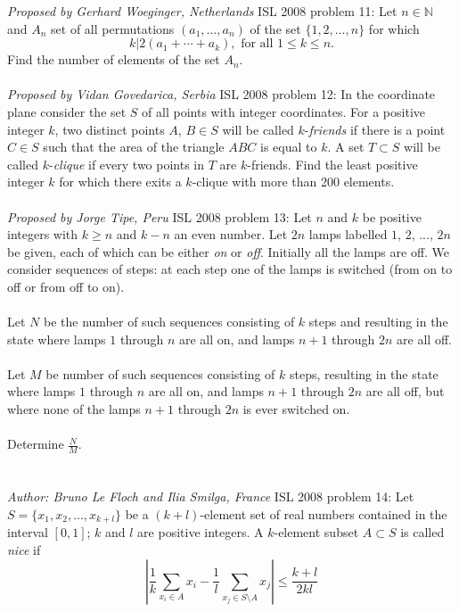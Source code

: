 \textit{Proposed by Gerhard Woeginger, Netherlands} 
ISL 2008 problem 11:  Let $n \in \mathbb N$ and $A_n$ set of all permutations $(a_1, \ldots, a_n)$ of the set $\{1, 2, \ldots , n\}$ for which
\[ k|2(a_1 + \cdots+ a_k), \text{ for all } 1 \leq k \leq n. \]
Find the number of elements of the set $A_n$. \\\\
\textit{Proposed by Vidan Govedarica, Serbia} 
ISL 2008 problem 12:  In the coordinate plane consider the set $ S$ of all points with integer coordinates. For a positive integer $ k$, two distinct points $A$, $ B\in S$ will be called $ k$-\textit{friends} if there is a point $ C\in S$ such that the area of the triangle $ ABC$ is equal to $ k$. A set $ T\subset S$ will be called $ k$-\textit{clique} if every two points in $ T$ are $ k$-friends. Find the least positive integer $ k$ for which there exits a $ k$-clique with more than 200 elements. \\\\
\textit{Proposed by Jorge Tipe, Peru} 
ISL 2008 problem 13:  Let $ n$ and $ k$ be positive integers with $ k \geq n$ and $ k - n$ an even number. Let $ 2n$ lamps labelled $ 1$, $ 2$, ..., $ 2n$ be given, each of which can be either \textit{on} or \textit{off}. Initially all the lamps are off. We consider sequences of steps: at each step one of the lamps is switched (from on to off or from off to on). \\\\
Let $ N$ be the number of such sequences consisting of $ k$ steps and resulting in the state where lamps $ 1$ through $ n$ are all on, and lamps $ n + 1$ through $ 2n$ are all off. \\\\
Let $ M$ be number of such sequences consisting of $ k$ steps, resulting in the state where lamps $ 1$ through $ n$ are all on, and lamps $ n + 1$ through $ 2n$ are all off, but where none of the lamps $ n + 1$ through $ 2n$ is ever switched on. \\\\
Determine $ \frac {N}{M}$. \\\\\\
\textit{Author: Bruno Le Floch and Ilia Smilga, France} 
ISL 2008 problem 14:  Let $ S = \{x_1, x_2, \ldots, x_{k + l}\}$ be a $ (k + l)$-element set of real numbers contained in the interval $ [0, 1]$; $ k$ and $ l$ are positive integers. A $ k$-element subset $ A\subset S$ is called \textit{nice} if
\[
\left |\frac {1}{k}\sum_{x_i\in A} x_i - \frac {1}{l}\sum_{x_j\in S\setminus A} x_j\right |\le \frac {k + l}{2kl}
\]
